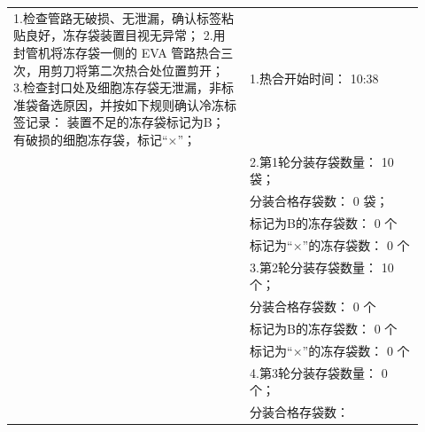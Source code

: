 \documentclass[UTF8,10pt,a4paper,fontset=fandol]{ctexart}
\newcommand{\fieldvalue}[1]{#1}
\newcommand{\handwritten}[1]{#1}
\begin{document}
\begin{tabular}{|p{0.53\linewidth}|p{0.39\linewidth}|}
\hline
1.检查管路无破损、无泄漏，确认标签粘贴良好，冻存袋装置目视无异常；\newline
2.用封管机将冻存袋一侧的 EVA 管路热合三次，用剪刀将第二次热合处位置剪开；\newline
3.检查封口处及细胞冻存袋无泄漏，非标准袋备选原因，并按如下规则确认冷冻标签记录：\newline
\hspace{1em}装置不足的冻存袋标记为B；\newline
\hspace{1em}有破损的细胞冻存袋，标记“×”； &
1.热合开始时间：
\fieldvalue{\handwritten{10:38}}\\
&
2.第1轮分装存袋数量：
\fieldvalue{\handwritten{10}} 袋；\\
&\quad 分装合格存袋数：
\fieldvalue{\handwritten{0}} 袋；\\
&\quad 标记为B的冻存袋数：
\fieldvalue{\handwritten{0}} 个\\
&\quad 标记为“×”的冻存袋数：
\fieldvalue{\handwritten{0}} 个\\
&3.第2轮分装存袋数量：
\fieldvalue{\handwritten{10}} 个；\\
&\quad 分装合格存袋数：
\fieldvalue{\handwritten{0}} 个\\
&\quad 标记为B的冻存袋数：
\fieldvalue{\handwritten{0}} 个\\
&\quad 标记为“×”的冻存袋数：
\fieldvalue{\handwritten{0}} 个\\
&4.第3轮分装存袋数量：
\fieldvalue{\handwritten{0}} 个；\\
&\quad 分装合格存袋数：

\end{tabular}
\end{document}
